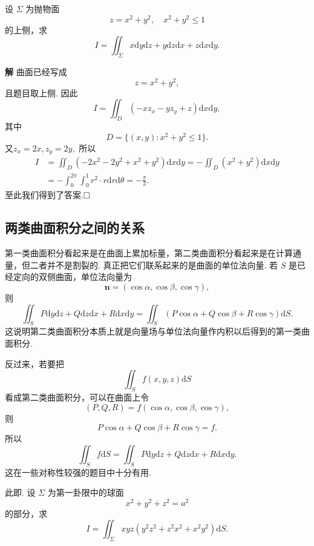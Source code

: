 \documentclass{ctexart}
\newenvironment{custom}[1]{\par\noindent \textbf{#1}\quad}{\par\vspace{1em}}
\begin{document}
\begin{example}
设 $\Sigma$ 为抛物面
\[
z=x^{2}+y^{2},\quad x^{2}+y^{2}\leqslant 1
\]
的上侧，求
\[
I=\iint_{\Sigma}x\mathrm{d}y\mathrm{d}z+y\mathrm{d}z\mathrm{d}x+z\mathrm{d}x\mathrm{d}y.
\]
\end{example}

\begin{custom}{解}
曲面已经写成
\[
z=x^{2}+y^{2},
\]
且题目取上侧. 因此
\[
I=\iint_{D}(-xz_{x}-yz_{y}+z)\mathrm{d}x\mathrm{d}y,
\]
其中
\[
D=\{(x,y):x^{2}+y^{2}\leqslant 1\}.
\]
又$z_{x}=2x, z_{y}=2y,$
所以
\[
\begin{aligned}
I
&=\iint_{D}\left(-2x^{2}-2y^{2}+x^{2}+y^{2}\right)\mathrm{d}x\mathrm{d}y=-\iint_{D}(x^{2}+y^{2})\mathrm{d}x\mathrm{d}y\\
&=-\int_{0}^{2\pi}\int_{0}^{1}r^{2}\cdot r\mathrm{d}r\mathrm{d}\theta=-\frac{\pi}{2}.
\end{aligned}
\]
至此我们得到了答案.$\hfill{\square}$
\end{custom}

\subsection{两类曲面积分之间的关系}

第一类曲面积分看起来是在曲面上累加标量，第二类曲面积分看起来是在计算通量，但二者并不是割裂的. 真正把它们联系起来的是曲面的单位法向量. 若 $S$ 是已经定向的双侧曲面，单位法向量为
\[
\boldsymbol{n}=(\cos\alpha,\cos\beta,\cos\gamma),
\]
则
\[
\iint_{S}P\mathrm{d}y\mathrm{d}z+Q\mathrm{d}z\mathrm{d}x+R\mathrm{d}x\mathrm{d}y
=
\iint_{S}(P\cos\alpha+Q\cos\beta+R\cos\gamma)\mathrm{d}S.
\]
这说明第二类曲面积分本质上就是向量场与单位法向量作内积以后得到的第一类曲面积分.

反过来，若要把
\[
\iint_{S}f(x,y,z)\mathrm{d}S
\]
看成第二类曲面积分，可以在曲面上令
\[
(P,Q,R)=f(\cos\alpha,\cos\beta,\cos\gamma),
\]
则
\[
P\cos\alpha+Q\cos\beta+R\cos\gamma=f.
\]
所以
\[
\iint_{S}f\mathrm{d}S
=
\iint_{S}P\mathrm{d}y\mathrm{d}z+Q\mathrm{d}z\mathrm{d}x+R\mathrm{d}x\mathrm{d}y.
\]
这在一些对称性较强的题目中十分有用.

\begin{example}
此即\cite[例题25.2.3]{XHM}. 设 $\Sigma$ 为第一卦限中的球面
\[
x^{2}+y^{2}+z^{2}=a^{2}
\]
的部分，求
\[
I=\iint_{\Sigma}xyz(y^{2}z^{2}+z^{2}x^{2}+x^{2}y^{2})\mathrm{d}S.
\]
\end{example}
\end{document}
